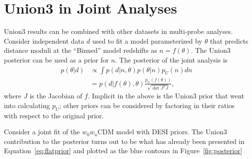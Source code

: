 \documentclass[11pt,a4paper]{article}
\begin{document}
\section{Union3 in Joint Analyses}
\label{sec:joint}
Union3 results can be combined with other datasets in multi-probe analyses.
Consider independent data $d$ used to fit a model parameterized by $\theta$
that predicts distance moduli at the ``Binned'' model redshifts as $n=f(\theta)$.
The Union3 posterior can be used as a prior for $n$.  The posterior of the joint analysis is
\begin{align}
p(\theta|d) &\propto \int  p(d|n,\theta)p(\theta|n)p_U(n) dn\\
&=  p(d|f(\theta),\theta) \frac{p_U(f(\theta))} {\sqrt{\det{J^TJ}}}, \label{eq:correct}
\end{align}
where $J$ is the Jacobian of $f$.
Implicit in the above is the Union3 prior
that went into calculating $p_U$; other priors can be considered by factoring in their ratios with respect to the 
original prior.

Consider a joint fit of the  $w_0w_a$CDM model with DESI priors.  The Union3 contribution to the posterior turns out to be
what has already been presented in 
Equation~\ref{eq:flatprior} and plotted as the blue contours in
Figure~\ref{fig:posterior} 
\end{document}
